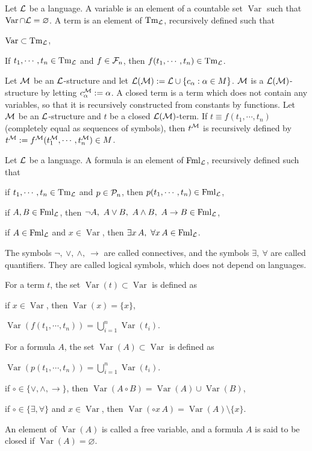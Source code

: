\documentclass{../../../small}
\DeclareMathOperator{\Var}{Var}
\DeclareMathOperator{\Tm}{Tm}
\DeclareMathOperator{\Fml}{Fml}
\begin{document}
\begin{defn}[Term]
Let $\mathcal{L}$ be a language.
A variable is an element of a countable set $\Var$ such that $\Var\cap\cL=\varnothing$.
A term is an element of $\Tm_\cL$, recursively defined such that
\begin{parts}
\item $\Var\subset\Tm_\cL$,
\item If $t_1,\cdots,t_n\in\Tm_\cL$ and $f\in\mathcal{F}_n$, then $f(t_1,\cdots,t_n)\in\Tm_\cL$.
\end{parts}
\end{defn}


Let $\mathcal{M}$ be an $\mathcal{L}$-structure and let $\mathcal{L}(\mathcal{M}):=\mathcal{L}\cup\{c_\alpha:\alpha\in M\}$.
$\mathcal{M}$ is a $\mathcal{L}(\mathcal{M})$-structure by letting $c_\alpha^{\mathcal{M}}:=\alpha$.
A closed term is a term which does not contain any variables, so that it is recursively constructed from constants by functions.
Let $\mathcal{M}$ be an $\mathcal{L}$-structure and $t$ be a closed $\mathcal{L}(\mathcal{M})$-term.
If $t\equiv f(t_1,\cdots,t_n)$ (completely equal as sequences of symbols), then $t^{\mathcal{M}}$ is recursively defined by $t^{\mathcal{M}}:=f^{\mathcal{M}}(t_1^{\mathcal{M}},\cdots,t_n^{\mathcal{M}})\in M$.


\begin{defn}[Formula]
Let $\mathcal{L}$ be a language.
A formula is an element of $\Fml_\cL$, recursively defined such that
\begin{parts}
\item if $t_1,\cdots,t_n\in\Tm_\cL$ and $p\in\mathcal{P}_n$, then $p(t_1,\cdots,t_n)\in\Fml_\cL$,
\item if $A,B\in\Fml_\cL$, then $\neg A,\ A\vee B,\ A\wedge B,\ A\to B\in\Fml_\cL$,
\item if $A\in\Fml_\cL$ and $x\in\Var$, then $\exists x\,A,\ \forall x\,A\in\Fml_\cL$.
\end{parts}
The symbols $\neg,\ \vee,\ \wedge,\ \to$ are called connectives, and the symbols $\exists,\ \forall$ are called quantifiers.
They are called logical symbols, which does not depend on languages. 
\end{defn}

\begin{defn}
For a term $t$, the set $\Var(t)\subset\Var$ is defined as
\begin{parts}
\item if $x\in\Var$, then $\Var(x)=\{x\}$,
\item $\Var(f(t_1,\cdots,t_n))=\bigcup_{i=1}^n\Var(t_i)$.
\end{parts}
For a formula $A$, the set $\Var(A)\subset\Var$ is defined as
\begin{parts}
\item $\Var(p(t_1,\cdots,t_n))=\bigcup_{i=1}^n\Var(t_i)$.
\item if $\circ\in\{\vee,\wedge,\to\}$, then $\Var(A\circ B)=\Var(A)\cup\Var(B)$,
\item if $\circ\in\{\exists,\forall\}$ and $x\in\Var$, then $\Var(\circ x\,A)=\Var(A)\setminus\{x\}$.
\end{parts}
An element of $\Var(A)$ is called a free variable, and a formula $A$ is said to be closed if $\Var(A)=\varnothing$.
\end{defn}
\end{document}
